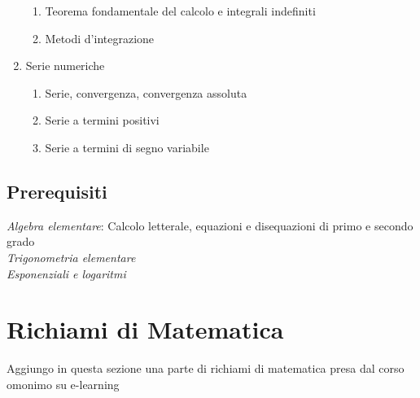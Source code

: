 \documentclass[12pt, a4paper, openany]{book}
\begin{document}
\begin{enumerate}
\begin{enumerate}
    \item Teorema fondamentale del calcolo e integrali indefiniti
    \item Metodi d'integrazione
\end{enumerate}
\item Serie numeriche
\begin{enumerate}
    \item Serie, convergenza, convergenza assoluta
    \item Serie a termini positivi
    \item Serie a termini di segno variabile
\end{enumerate}
\end{enumerate}

\section{Prerequisiti}
\emph{Algebra elementare}: Calcolo letterale, equazioni e disequazioni di primo e secondo grado
\\\emph{Trigonometria elementare}
\\\emph{Esponenziali e logaritmi}

\chapter{Richiami di Matematica}
Aggiungo in questa sezione una parte di richiami di matematica presa dal corso omonimo su e-learning
\end{document}
